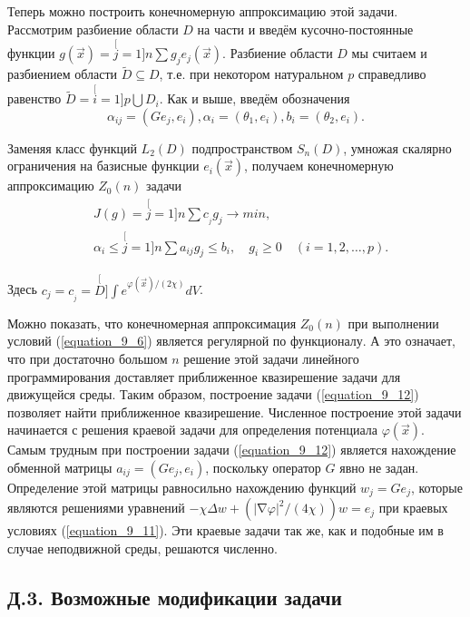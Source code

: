 Теперь можно построить конечномерную аппроксимацию этой задачи. Рассмотрим разбиение области $D$ на части и введём кусочно-постоянные функции $g(\vec x){=}{\stackrel[j=1]{n}{\sum}}g_je_j(\vec x)$. Разбиение области $D$ мы считаем и разбиением области $\tilde D{\subseteq}D$, т.е. при некотором натуральном $p$ справедливо равенство $\tilde D{=}{\stackrel[i=1]{p}{\bigcup}}D_i$. Как и выше, введём обозначения\[\alpha_{ij}{=}(Ge_j,e_i),\alpha_i{=}(\theta_1,e_i),b_i{=}(\theta_2,e_i).\]

Заменяя класс функций $L_2(D)$ подпространством $S_n(D)$, умножая скалярно ограничения на базисные функции $e_i(\vec x)$, получаем конечномерную аппроксимацию $Z_0(n)$ задачи
 	    \begin{equation}\label{equation_9_12} \begin{split}
        &J(g)={\stackrel[j=1]{n}{\sum}}c_{_j}g_j\rightarrow min,\\
        &\alpha_i\le{\stackrel[j=1]{n}{\sum}}a_{ij}g_j\le b_i,\quad g_i\ge 0\quad (i=1,2,\dots,p).
         \end{split}\end{equation}

Здесь $\displaystyle c_j=c_{_j}={\stackrel[D]{}{\int}}e^{\varphi(\vec x)/(2\chi)}dV$.

Можно показать, что конечномерная аппроксимация $Z_0(n)$ при выполнении условий (\ref{equation_9_6}) является регулярной по функционалу. А это означает, что при достаточно большом $n$ решение этой задачи линейного программирования доставляет приближенное квазирешение задачи для движущейся среды. Таким образом, построение задачи (\ref{equation_9_12}) позволяет найти приближенное квазирешение. Численное построение этой задачи начинается с решения краевой задачи для определения потенциала $\varphi(\vec x)$. Самым трудным при построении задачи (\ref{equation_9_12}) является нахождение обменной матрицы $a_{ij}{=}(Ge_j,e_i)$, поскольку оператор $G$ явно не задан. Определение этой матрицы равносильно нахождению функций $w_j=Ge_j$, которые являются решениями уравнений $-\chi\Delta w{+}\left(\left|\mathop{\nabla}\varphi\right|^2{/}(4\chi) \right)w{=}e_j$ при краевых условиях (\ref{equation_9_11}). Эти краевые задачи так же, как и подобные им в случае неподвижной среды, решаются численно.

\subsection*{ \center Д.3. Возможные модификации задачи}

